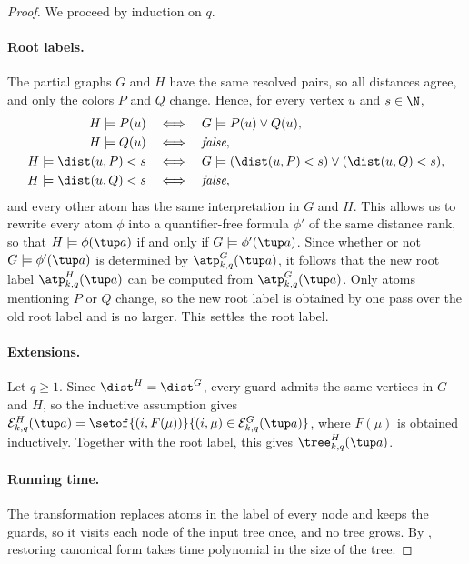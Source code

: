 \begin{proof}
We proceed by induction on $q$.

\paragraph{Root labels.}
The partial graphs $G$ and $H$ have the same resolved pairs, so all distances agree, and only the colors $P$ and $Q$ change.
Hence, for every vertex $u$ and $s\in\N$,
\begin{align*}
H\models P(u)&\quad\Longleftrightarrow\quad G\models P(u)\lor Q(u),\\
H\models Q(u)&\quad\Longleftrightarrow\quad\textit{false},\\
H\models\dist(u,P)<s&\quad\Longleftrightarrow\quad G\models(\dist(u,P)<s)\lor(\dist(u,Q)<s),\\
H\models\dist(u,Q)<s&\quad\Longleftrightarrow\quad\textit{false},
\end{align*}
and every other atom has the same interpretation in $G$ and $H$.
This allows us to rewrite every atom \(\phi\)
into a quantifier-free formula \(\phi'\)
of the same distance rank, so that
$H\models\phi(\tup a)$ if and only if $G\models\phi'(\tup a)$.
Since whether or not $G\models\phi'(\tup a)$ is determined by $\atp^G_{k,q}(\tup a)$, it follows that the new root label $\atp^{H}_{k,q}(\tup a)$ can be computed  from $\atp^G_{k,q}(\tup a)$.
Only atoms mentioning $P$ or $Q$ change, so the new root label is obtained by one pass over the old root label and is no larger.
This settles the root label.

\paragraph{Extensions.}
Let $q\ge1$.
Since $\dist^{H}=\dist^G$, every guard admits the same vertices in $G$ and $H$, so the inductive assumption gives $\mathcal E^{H}_{k,q}(\tup a)=\setof{(i,F(\mu))}{(i,\mu)\in\mathcal E^G_{k,q}(\tup a)}$,
where $F(\mu)$ is obtained inductively.
Together with the root label, this gives $\tree^{H}_{k,q}(\tup a)$.

\paragraph{Running time.}
The transformation replaces atoms in the label of every node and keeps the guards, so it visits each node of the input tree once, and no tree grows.
By , restoring canonical form takes time polynomial  in the size of the tree.
\end{proof}

